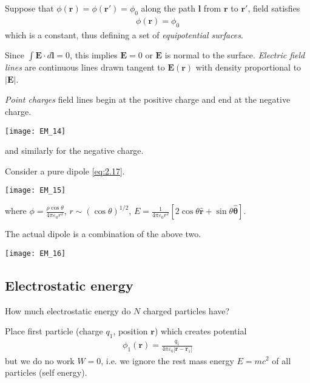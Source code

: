\documentclass[a4paper]{article}
\begin{document}
Suppose that $\phi(\mathbf{r}) = \phi(\mathbf{r'}) =\phi_0$ along the path $\mathbf{l}$ from $\mathbf{r}$ to $\mathbf{r'}$, field satisfies
\begin{equation*}\tag{2.25} \label{eq:2.25}
\begin{aligned}
\phi(\mathbf{r})=\phi_0
\end{aligned}
\end{equation*}
which is a constant, thus defining a set of \emph{equipotential surfaces}.

Since $\int \mathbf{E}\cdot d\mathbf{l} = 0$, this implies $\mathbf{E}=0$ or $\mathbf{E}$ is normal to the surface. \emph{Electric field lines} are continuous lines drawn tangent to $\mathbf{E}(\mathbf{r})$ with density proportional to $|\mathbf{E}|$.

\begin{eg}
\emph{Point charges} field lines begin at the positive charge and end at the negative charge.

\texttt{[image: EM\_14]}

and similarly for the negative charge.
\end{eg}

\begin{eg}
Consider a pure dipole \eqref{eq:2.17}.

\texttt{[image: EM\_15]}

where $\phi = \frac{\rho \cos \theta}{4\pi \varepsilon_0 r^2}$, $r \sim (\cos\theta)^{1/2}$, $E = \frac{1}{4\pi\varepsilon_0 r^2} [2\cos\theta \hat{\mathbf{r}}+\sin\theta \hat{\mathbf{\theta}}]$.
\end{eg}

\begin{eg}
The actual dipole is a combination of the above two.

\texttt{[image: EM\_16]}
\end{eg}

\subsection{Electrostatic energy}
How much electrostatic energy do $N$ charged particles have?

Place first particle (charge $q_1$, position $\mathbf{r}$) which creates potential
\begin{equation*}
\begin{aligned}
\phi_1(\mathbf{r}) = \frac{q_1}{4\pi \varepsilon_0|\mathbf{r}-\mathbf{r}_1|}
\end{aligned}
\end{equation*}
but we do no work $W=0$, i.e. we ignore the rest mass energy $E=mc^2$ of all particles (self energy).
\end{document}
